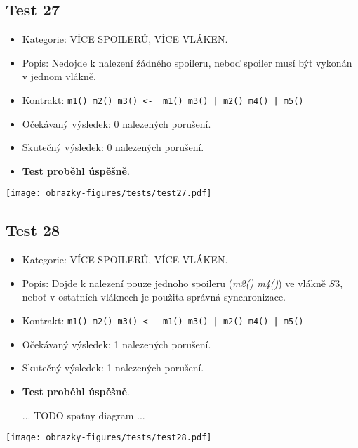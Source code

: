 \subsection*{Test 27}
\begin{itemize}
\item Kategorie: VÍCE SPOILERŮ, VÍCE VLÁKEN.
\item Popis: Nedojde k nalezení žádného spoileru, neboď spoiler musí být vykonán v jednom vlákně. 
\item Kontrakt: \texttt{m1() m2() m3() <- { m1() m3() | m2() m4() | m5() }}
\item Očekávaný výsledek: 0 nalezených porušení.

\item Skutečný výsledek: 0 nalezených porušení.
\item \textbf{Test proběhl úspěšně}.
\end{itemize}
\begin{center}
    \centering
    \texttt{[image: obrazky-figures/tests/test27.pdf]}
    \label{test27}
\end{center}

\subsection*{Test 28}
\begin{itemize}
\item Kategorie: VÍCE SPOILERŮ, VÍCE VLÁKEN.
\item Popis: Dojde k nalezení pouze jednoho spoileru (\textit{m2() m4()}) ve vlákně $S3$, neboť v ostatních vláknech je použita správná synchronizace. 
\item Kontrakt: \texttt{m1() m2() m3() <- { m1() m3() | m2() m4() | m5() }}
\item Očekávaný výsledek: 1 nalezených porušení.

\item Skutečný výsledek: 1 nalezených porušení.
\item \textbf{Test proběhl úspěšně}.

... TODO spatny diagram ...
\end{itemize}
\begin{center}
    \centering
    \texttt{[image: obrazky-figures/tests/test28.pdf]}
    \label{test28}
\end{center}

